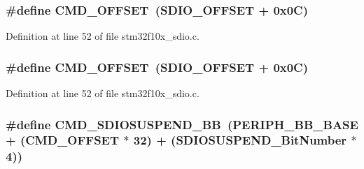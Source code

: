 \subsubsection[{\texorpdfstring{C\+M\+D\+\_\+\+O\+F\+F\+S\+ET}{CMD_OFFSET}}]{\setlength{\rightskip}{0pt plus 5cm}\#define C\+M\+D\+\_\+\+O\+F\+F\+S\+ET~({\bf S\+D\+I\+O\+\_\+\+O\+F\+F\+S\+ET} + 0x0\+C)}\hypertarget{group___s_d_i_o___private___types_definitions_gaf12d26702ce7a88d2a3dae87f000b75e}{}\label{group___s_d_i_o___private___types_definitions_gaf12d26702ce7a88d2a3dae87f000b75e}


Definition at line 52 of file stm32f10x\+\_\+sdio.\+c.

\subsubsection[{\texorpdfstring{C\+M\+D\+\_\+\+O\+F\+F\+S\+ET}{CMD_OFFSET}}]{\setlength{\rightskip}{0pt plus 5cm}\#define C\+M\+D\+\_\+\+O\+F\+F\+S\+ET~({\bf S\+D\+I\+O\+\_\+\+O\+F\+F\+S\+ET} + 0x0\+C)}\hypertarget{group___s_d_i_o___private___types_definitions_gaf12d26702ce7a88d2a3dae87f000b75e}{}\label{group___s_d_i_o___private___types_definitions_gaf12d26702ce7a88d2a3dae87f000b75e}


Definition at line 52 of file stm32f10x\+\_\+sdio.\+c.

\subsubsection[{\texorpdfstring{C\+M\+D\+\_\+\+S\+D\+I\+O\+S\+U\+S\+P\+E\+N\+D\+\_\+\+BB}{CMD_SDIOSUSPEND_BB}}]{\setlength{\rightskip}{0pt plus 5cm}\#define C\+M\+D\+\_\+\+S\+D\+I\+O\+S\+U\+S\+P\+E\+N\+D\+\_\+\+BB~({\bf P\+E\+R\+I\+P\+H\+\_\+\+B\+B\+\_\+\+B\+A\+SE} + ({\bf C\+M\+D\+\_\+\+O\+F\+F\+S\+ET} $\ast$ 32) + ({\bf S\+D\+I\+O\+S\+U\+S\+P\+E\+N\+D\+\_\+\+Bit\+Number} $\ast$ 4))}\hypertarget{group___s_d_i_o___private___types_definitions_ga931e48aa282e2a937308f57f807e0781}{}\label{group___s_d_i_o___private___types_definitions_ga931e48aa282e2a937308f57f807e0781}


